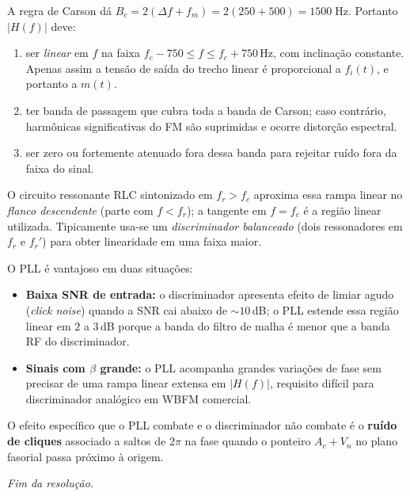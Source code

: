 \documentclass[11pt,a4paper]{article}
\begin{document}
\begin{resolucao}

A regra de Carson dá $B_c = 2(\Delta f + f_m) = 2(250 + 500) = 1500\;\text{Hz}$. Portanto $|H(f)|$ deve:
\begin{enumerate}\itemsep0pt
  \item ser \emph{linear} em $f$ na faixa $f_c - 750 \le f \le f_c + 750$\,Hz, com inclinação constante. Apenas assim a tensão de saída do trecho linear é proporcional a $f_i(t)$, e portanto a $m(t)$.
  \item ter banda de passagem que cubra toda a banda de Carson; caso contrário, harmônicas significativas do FM são suprimidas e ocorre distorção espectral.
  \item ser zero ou fortemente atenuado fora dessa banda para rejeitar ruído fora da faixa do sinal.
\end{enumerate}

O circuito ressonante RLC sintonizado em $f_r > f_c$ aproxima essa rampa linear no \emph{flanco descendente} (parte com $f < f_r$); a tangente em $f = f_c$ é a região linear utilizada. Tipicamente usa-se um \emph{discriminador balanceado} (dois ressonadores em $f_r$ e $f_r'$) para obter linearidade em uma faixa maior.
\end{resolucao}

\begin{resolucao}

O PLL é vantajoso em duas situações:
\begin{itemize}\itemsep0pt
  \item \textbf{Baixa SNR de entrada:} o discriminador apresenta efeito de limiar agudo (\textit{click noise}) quando a SNR cai abaixo de $\sim 10$\,dB; o PLL estende essa região linear em $2$ a $3$\,dB porque a banda do filtro de malha é menor que a banda RF do discriminador.
  \item \textbf{Sinais com $\beta$ grande:} o PLL acompanha grandes variações de fase sem precisar de uma rampa linear extensa em $|H(f)|$, requisito difícil para discriminador analógico em WBFM comercial.
\end{itemize}

O efeito específico que o PLL combate e o discriminador não combate é o \textbf{ruído de cliques} associado a saltos de $2\pi$ na fase quando o ponteiro $A_c + V_n$ no plano fasorial passa próximo à origem.
\end{resolucao}

\vfill
\begin{center}
  \small\textit{Fim da resolução.}
\end{center}
\end{document}
